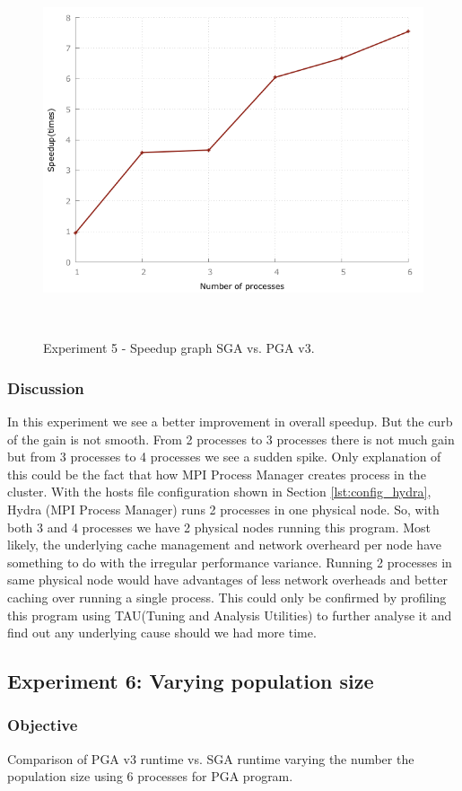 \begin{figure}[H]
\begin{center}
  \includegraphics[width=.7 \linewidth]{stats_data_new/graphs/pga_partial_xNodes_line.png}
  \caption{Experiment 5 - Speedup graph SGA vs. PGA v3.}
  \end{center}\
\end{figure}

\subsubsection{Discussion}
In this experiment we see a better improvement in overall speedup. But the curb of the gain is not smooth. From 2 processes to 3 processes there is not much gain but from 3 processes to 4 processes we see a sudden spike. Only explanation of this could be the fact that how MPI Process Manager creates process in the cluster. With the hosts file configuration shown in Section \ref{lst:config_hydra}, Hydra (MPI Process Manager) runs 2 processes in one physical node. So, with both 3 and 4 processes we have 2 physical nodes running this program. Most likely, the underlying cache management and network overheard per node have something to do with the irregular performance variance. Running 2 processes in same physical node would have advantages of less network overheads and better caching over running a single process. This could only be confirmed by profiling this program using TAU(Tuning and Analysis Utilities) to further analyse it and find out any underlying cause should we had more time.


\subsection{Experiment 6: Varying population size}

\subsubsection{Objective}
Comparison of PGA v3 runtime vs. SGA runtime varying the number the population size using 6 processes for PGA program.

